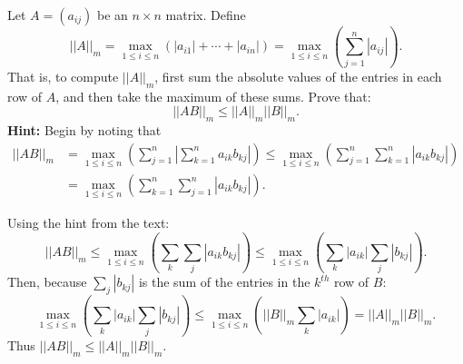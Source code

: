 \documentclass{ximera}
\begin{document}
\begin{exercise}  \label{c6.2.7}
Let $A=(a_{ij})$ be an $n\times n$ matrix.  Define
\[
||A||_m = \max_{1\leq i\leq n} (|a_{i1}|+\cdots+|a_{in}|)
= \max_{1\leq i\leq n} \left(\sum_{j=1}^n|a_{ij}|\right).
\]
That is, to compute $||A||_m$, first sum the absolute values of the entries
in each row of $A$, and then take the maximum of these sums.  Prove that:
\[
||AB||_m \leq ||A||_m ||B||_m.
\]
{\bf Hint:} Begin by noting that
\begin{align*}
||AB||_m &=
\max_{1\leq i\leq n}\left(\sum_{j=1}^n\left|\sum_{k=1}^na_{ik}b_{kj}\right|
\right)\leq \max_{1\leq i\leq n}\left(\sum_{j=1}^n\sum_{k=1}^n\left|a_{ik}b_{kj}
           \right|\right) \\
  &= \max_{1\leq i\leq n}\left(\sum_{k=1}^n\sum_{j=1}^n
\left|a_{ik}b_{kj}\right|\right).
\end{align*}

\begin{solution}
Using the hint from the text:
\[
||AB||_m \leq \max_{1\leq i\leq n}
\left(\sum_k\sum_j\left|a_{ik}b_{kj}\right|\right) \leq
\max_{1\leq i\leq n} \left(\sum_k|a_{ik}|\sum_j|b_{kj}|\right).
\]
Then, because $\sum_j|b_{kj}|$ is the sum of the entries in the $k^{th}$
row of $B$:
\[
\max_{1\leq i\leq n}
\left(\sum_k|a_{ik}|\sum_j|b_{kj}|\right) \leq
\max_{1 \leq i \leq n}
\left(||B||_m \sum_k|a_{ik}|\right) =
||A||_m ||B||_m.
\]
Thus $||AB||_m \leq ||A||_m ||B||_m$.

\end{solution}
\end{exercise}
\end{document}

